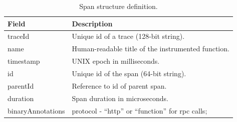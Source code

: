 \begin{table}[H]
    \caption{Span structure definition.}
    \label{table:data_set_span_structure_definition}
    \centering
    \begin{tabularx}{\linewidth} {
        |>{\hsize=0.60\hsize}X|
        >{\hsize=1.40\hsize}X|}
        \hline
        \textbf{Field}
         & \textbf{Description}                                                                                                                                                                                                             \\ \hline \hline
        traceId
         & Unique id of a trace (128-bit string).                                                                                                                                                                                           \\ \hline
        name
         & Human-readable title of the instrumented function.                                                                                                                                                                               \\ \hline
        timestamp
         & UNIX epoch in milliseconds.                                                                                                                                                                                                      \\ \hline
        id
         & Unique id of the span (64-bit string).                                                                                                                                                                                           \\ \hline
        parentId
         & Reference to id of parent span.                                                                                                                                                                                                  \\ \hline
        duration
         & Span duration in microseconds.                                                                                                                                                                                                   \\ \hline
        binaryAnnotations
         &
        protocol - ``\gls{http}'' or ``function'' for \gls{rpc} calls; \newline

\end{tabularx}
\end{table}
